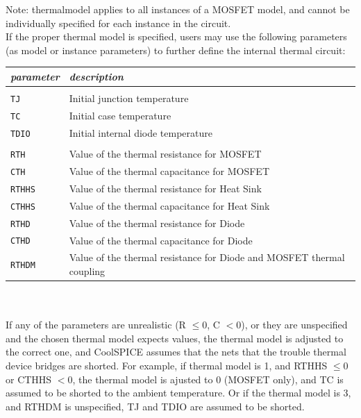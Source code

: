 Note: {\selectfont thermalmodel} applies to all instances of a MOSFET model, and cannot be individually specified for each instance in the circuit. \\

If the proper thermal model is specified, users may use the following parameters (as model or instance parameters) to further define the internal thermal circuit: \\ 

\begin{tabular}{l l}
	\textit{parameter} & \textit{description} \\ \hline \\ \vspace{-0.8\parskip}
	\texttt{TJ} & Initial junction temperature \\
	\texttt{TC} & Initial case temperature \\
	\texttt{TDIO} & Initial internal diode temperature \\ \\

	\texttt{RTH} & Value of the thermal resistance for MOSFET \\
	\texttt{CTH} & Value of the thermal capacitance for MOSFET \\
	\texttt{RTHHS} & Value of the thermal resistance for Heat Sink \\
	\texttt{CTHHS} & Value of the thermal capacitance for Heat Sink \\
	\texttt{RTHD} & Value of the thermal resistance for Diode \\
	\texttt{CTHD} & Value of the thermal capacitance for Diode \\
	\texttt{RTHDM} & Value of the thermal resistance for Diode and MOSFET thermal coupling \\
\end{tabular} \\ \\

If any of the parameters are unrealistic (R $\leq 0$, C $< 0$), or they are unspecified and the chosen thermal model expects values, the thermal model is adjusted to the correct one, and CoolSPICE assumes that the nets that the trouble thermal device bridges are shorted. For example, if thermal model is 1, and RTHHS $\leq 0$ or CTHHS $< 0$, the thermal model is ajusted to 0 (MOSFET only), and TC is assumed to be shorted to the ambient temperature. Or if the thermal model is 3, and RTHDM is unspecified, TJ and TDIO are assumed to be shorted. \\

